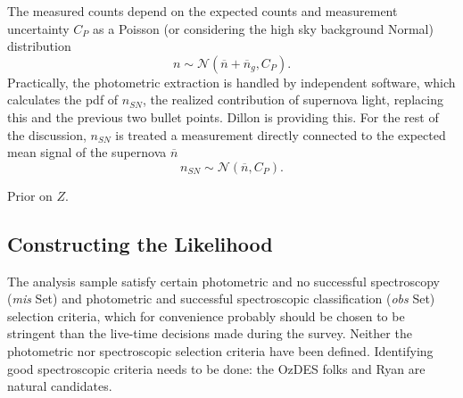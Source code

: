 \documentclass[preprint,3p]{elsarticle}
\begin{document}
The measured counts depend on the expected counts and measurement uncertainty
$C_P$ as a Poisson (or considering the high sky background Normal) distribution
\begin{equation}
n \sim \mathcal{N} (\overline{n}+\overline{n}_g ,C_P).
\label{ADU:eqn}
\end{equation}
Practically, the photometric extraction is handled by independent software, which calculates
the pdf of $n_{\mathit{SN}}$, the realized contribution of supernova light,
replacing this and the previous two bullet points.  Dillon is providing this.
For the rest of the discussion, $n_{\mathit{SN}}$ is treated a measurement
directly connected to the expected mean signal of the supernova
$\overline{n}$
\begin{equation}
n_{SN} \sim \mathcal{N} (\overline{n} ,C_P).
\end{equation}

Prior on $Z$.
\subsection{Constructing the Likelihood}

The analysis sample satisfy certain photometric and no successful spectroscopy
({\it mis} Set)  and photometric
and successful spectroscopic classification ({\it obs} Set) selection criteria, which for convenience
probably should  be chosen to be stringent than the live-time decisions made during the survey.
Neither the photometric nor spectroscopic selection criteria have been defined.
Identifying good spectroscopic criteria needs to be done: the OzDES folks and Ryan are natural
candidates.

\end{document}
